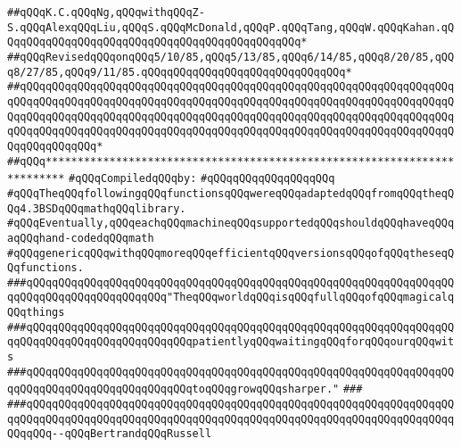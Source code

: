 \verb|##qQQqK.C.qQQqNg,qQQqwithqQQqZ-S.qQQqAlexqQQqLiu,qQQqS.qQQqMcDonald,qQQqP.qQQqTang,qQQqW.qQQqKahan.qQQqqQQqqQQqqQQqqQQqqQQqqQQqqQQqqQQqqQQqqQQqqQQq*|\newline
\verb|##qQQqRevisedqQQqonqQQq5/10/85,qQQq5/13/85,qQQq6/14/85,qQQq8/20/85,qQQq8/27/85,qQQq9/11/85.qQQqqQQqqQQqqQQqqQQqqQQqqQQqqQQq*|\newline
\verb|##qQQqqQQqqQQqqQQqqQQqqQQqqQQqqQQqqQQqqQQqqQQqqQQqqQQqqQQqqQQqqQQqqQQqqQQqqQQqqQQqqQQqqQQqqQQqqQQqqQQqqQQqqQQqqQQqqQQqqQQqqQQqqQQqqQQqqQQqqQQqqQQqqQQqqQQqqQQqqQQqqQQqqQQqqQQqqQQqqQQqqQQqqQQqqQQqqQQqqQQqqQQqqQQqqQQqqQQqqQQqqQQqqQQqqQQqqQQqqQQqqQQqqQQqqQQqqQQqqQQqqQQqqQQqqQQqqQQqqQQqqQQqqQQqqQQq*|\newline
\verb|##qQQq*************************************************************************|\newline
\newline
\verb|#qQQqCompiledqQQqby:|\newline
\verb|#qQQqqQQqqQQqqQQqqQQq|\newline
\newline
\verb|#qQQqTheqQQqfollowingqQQqfunctionsqQQqwereqQQqadaptedqQQqfromqQQqtheqQQq4.3BSDqQQqmathqQQqlibrary.|\newline
\verb|#qQQqEventually,qQQqeachqQQqmachineqQQqsupportedqQQqshouldqQQqhaveqQQqaqQQqhand-codedqQQqmath|\newline
\verb|#qQQqgenericqQQqwithqQQqmoreqQQqefficientqQQqversionsqQQqofqQQqtheseqQQqfunctions.|\newline
\newline
\newline
\verb|###qQQqqQQqqQQqqQQqqQQqqQQqqQQqqQQqqQQqqQQqqQQqqQQqqQQqqQQqqQQqqQQqqQQqqQQqqQQqqQQqqQQqqQQqqQQq"TheqQQqworldqQQqisqQQqfullqQQqofqQQqmagicalqQQqthings|\newline
\verb|###qQQqqQQqqQQqqQQqqQQqqQQqqQQqqQQqqQQqqQQqqQQqqQQqqQQqqQQqqQQqqQQqqQQqqQQqqQQqqQQqqQQqqQQqqQQqqQQqpatientlyqQQqwaitingqQQqforqQQqourqQQqwits|\newline
\verb|###qQQqqQQqqQQqqQQqqQQqqQQqqQQqqQQqqQQqqQQqqQQqqQQqqQQqqQQqqQQqqQQqqQQqqQQqqQQqqQQqqQQqqQQqqQQqqQQqtoqQQqgrowqQQqsharper."|\newline
\verb|###|\newline
\verb|###qQQqqQQqqQQqqQQqqQQqqQQqqQQqqQQqqQQqqQQqqQQqqQQqqQQqqQQqqQQqqQQqqQQqqQQqqQQqqQQqqQQqqQQqqQQqqQQqqQQqqQQqqQQqqQQqqQQqqQQqqQQqqQQqqQQqqQQqqQQqqQQq--qQQqBertrandqQQqRussell|\newline
